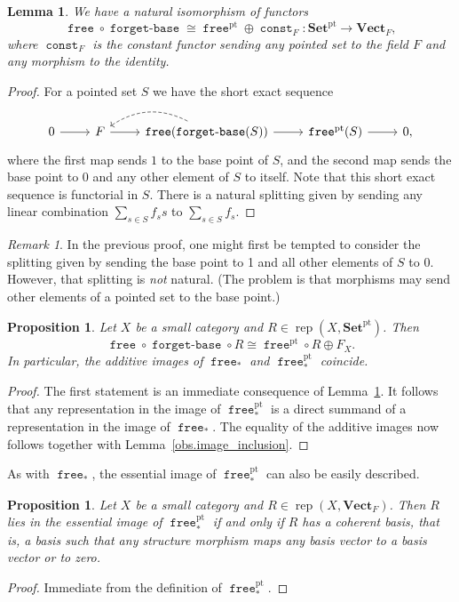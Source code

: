 \documentclass[a4paper]{amsart}
\theoremstyle{plain}
\newtheorem{lemma}[theorem]{Lemma}
\newtheorem{proposition}[theorem]{Proposition}
\theoremstyle{definition}
\theoremstyle{remark}
\newtheorem{remark}[theorem]{Remark}
\newcommand{\funct}[1]{\operatorname{\mathtt{#1}}}
\newcommand{\iso}{\cong}
\newcommand{\pSet}{\mathbf{Set}^\mathrm{pt}}
\newcommand{\VectF}{\mathbf{Vect}_F}
\DeclareMathOperator{\rep}{rep}
\begin{document}
\begin{lemma} \label{lem.const_splits_off}
We have a natural isomorphism of functors
\[ \funct{free} \circ \funct{forget-base} \iso \funct{free}^\mathrm{pt} \oplus \funct{const}_F \colon \pSet \to \VectF, \]
where $\funct{const}_F$ is the constant functor sending any pointed set to the field $F$ and any morphism to the identity.
\end{lemma}

\begin{proof}
For a pointed set \( S \) we have the short exact sequence
\[ \begin{tikzcd}
0 \ar[r] & F \ar[r] & \funct{free}(\funct{forget-base}(S)) \ar[r] \ar[l, bend right, dashed] & \funct{free}^\mathrm{pt}(S) \ar[r] & 0, 
\end{tikzcd} \]
where the first map sends \( 1 \) to the base point of $S$, and the second map sends the base point to $0$ and any other element of \( S \) to itself. Note that this short exact sequence is functorial in \( S \). There is a natural splitting given by sending any linear combination \( \sum_{s \in S} f_s s \) to \( \sum_{s \in S} f_s \).
\end{proof}

\begin{remark}
In the previous proof, one might first be tempted to consider the splitting given by sending the base point to 1 and all other elements of \( S \) to 0. However, that splitting is \emph{not} natural. (The problem is that morphisms may send other elements of a pointed set to the base point.)
\end{remark}

\begin{proposition} \label{prop.same_add_image}
Let $X$ be a small category and \( R \in \rep( X, \pSet ) \). Then
\[ \funct{free} \circ \funct{forget-base} \circ R  \iso \funct{free}^\mathrm{pt} \circ R \oplus F_X. \]
In particular, the additive images of \( \funct{free}_* \) and \( \funct{free}^\mathrm{pt}_* \) coincide. 
\end{proposition}

\begin{proof}
The first statement is an immediate consequence of Lemma~\ref{lem.const_splits_off}. It follows that any representation in the image of \( \funct{free}^\mathrm{pt}_* \) is a direct summand of a representation in the image of \( \funct{free}_* \). The equality of the additive images now follows together with Lemma~\ref{obs.image_inclusion}.
\end{proof}
As with $\funct{free}_*$, the essential image of $\funct{free}^\mathrm{pt}_*$ can also be easily described. 
\begin{proposition}
\label{prop:mult-basis}
Let $X$ be a small category and \( R \in \rep(X, \VectF) \). Then \( R \) lies in the essential image of \( \funct{free}^\mathrm{pt}_* \) if and only if \( R \) has a \emph{coherent basis}, that is, a basis such that any structure morphism maps any basis vector to a basis vector or to zero.
\end{proposition}
\begin{proof}Immediate from the definition of $\funct{free}^\mathrm{pt}_*$.
\end{proof}
\end{document}
